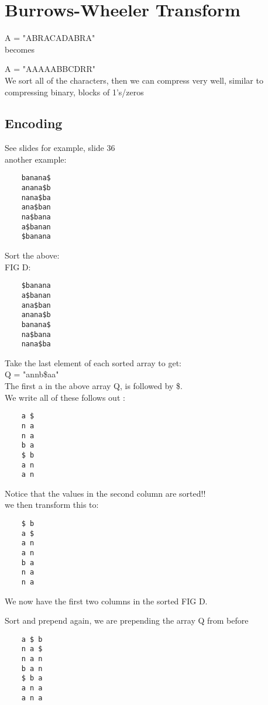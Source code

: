 \documentclass[12pt]{article}
\begin{document}
	\section*{Burrows-Wheeler Transform}
	A = "ABRACADABRA"\\
	
	becomes
	
	A = "AAAAABBCDRR"\\
	
	We sort all of the characters, then we can compress very well, similar to compressing binary, blocks of 1's/zeros\\
	
	\subsection*{Encoding}
	See slides for example, slide 36\\
	
	another example:\\
	\begin{verbatim}
	banana$
	anana$b
	nana$ba
	ana$ban
	na$bana
	a$banan
	$banana
	\end{verbatim}
	
	Sort the above:\\
	
	FIG D:
	\begin{verbatim}
	$banana
	a$banan
	ana$ban
	anana$b
	banana$
	na$bana
	nana$ba
	\end{verbatim}

	Take the last element of each sorted array to get:\\
	Q = "annb\$aa"\\
	
	The first a in the above array Q, is followed by \$.\\
	We write all of these follows out :
	
	\begin{verbatim}
	a $
	n a
	n a
	b a
	$ b
	a n
	a n
	\end{verbatim}
	
	Notice that the values in the second column are sorted!!\\
	
	we then transform this to:\\
	\begin{verbatim}
	$ b
	a $
	a n
	a n
	b a
	n a
	n a
	\end{verbatim}
	We now have the first two columns in the sorted FIG D.
	
	Sort and prepend again, we are prepending the array Q from before\\
	
	\begin{verbatim}
	a $ b
	n a $ 
	n a n
	b a n
	$ b a
	a n a
	a n a
	\end{verbatim}
	
	
	
	
\end{document}
